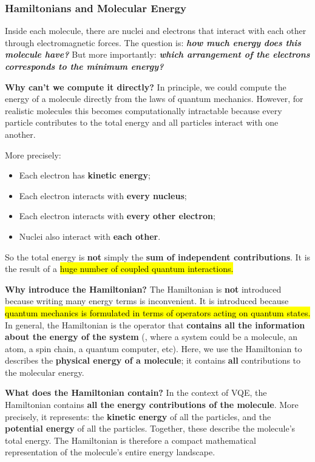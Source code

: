 \subsubsection{Hamiltonians and Molecular Energy}\label{sec:hamiltonians-and-molecular-energy}

Inside each molecule, there are nuclei and electrons that interact with each other through electromagnetic forces. The question is: \emph{\textbf{how much energy does this molecule have?}} But more importantly: \textbf{\emph{which arrangement of the electrons corresponds to the minimum energy?}}

\highspace
\textcolor{Green3}{ \textbf{Why can't we compute it directly?}} In principle, we could compute the energy of a molecule directly from the laws of quantum mechanics. However, for realistic molecules this becomes computationally intractable because every particle contributes to the total energy and all particles interact with one another.

\highspace
More precisely:
\begin{itemize}
    \item Each electron has \textbf{kinetic energy};
    \item Each electron interacts with \textbf{every nucleus};
    \item Each electron interacts with \textbf{every other electron};
    \item Nuclei also interact with \textbf{each other}.
\end{itemize}
So the total energy is \textbf{not} simply the \textbf{sum of independent contributions}. It is the result of a \hl{huge number of coupled quantum interactions.}

\highspace
\textcolor{Green3}{ \textbf{Why introduce the Hamiltonian?}} The Hamiltonian is \textbf{not} introduced because writing many energy terms is inconvenient. It is introduced because \hl{quantum mechanics is formulated in terms of operators acting on quantum states.} In general, the Hamiltonian is the operator that \textbf{contains all the information about the energy of the system} (, where a system could be a molecule, an atom, a spin chain, a quantum computer, etc). Here, we use the Hamiltonian to describes the \textbf{physical energy of a molecule}; it contains \textbf{all} contributions to the molecular energy.

\highspace
\textcolor{Green3}{ \textbf{What does the Hamiltonian contain?}} In the context of VQE, the Hamiltonian contains \textbf{all the energy contributions of the molecule}. More precisely, it represents: the \textbf{kinetic energy} of all the particles, and the \textbf{potential energy} of all the particles. Together, these describe the molecule's total energy. The Hamiltonian is therefore a compact mathematical representation of the molecule's entire energy landscape.

